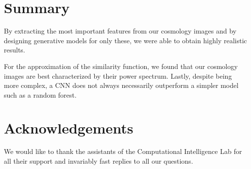 \documentclass[10pt,conference,compsocconf]{IEEEtran}
\newcommand\TODO[1]{\textcolor{red}{#1}} %
\begin{document}

\section{Summary}

By extracting the most important features from our cosmology images and by designing generative models for only these, we were able to obtain highly realistic results.


For the approximation of the similarity function, we found that our cosmology images are best characterized by their power spectrum. Lastly, despite being more complex, a CNN does not always necessarily outperform a simpler model such as a random forest.


\section*{Acknowledgements}
We would like to thank the assistants of the Computational Intelligence Lab for all their support and invariably fast replies to all our questions.

\newpage





\clearpage



\end{document}
